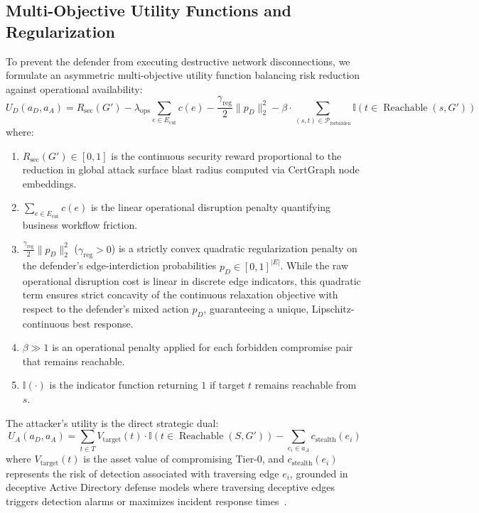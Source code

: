 \subsection{Multi-Objective Utility Functions and Regularization}
To prevent the defender from executing destructive network disconnections, we formulate an asymmetric multi-objective utility function balancing risk reduction against operational availability:
\begin{equation}
U_D(a_D, a_A) = R_{\text{sec}}(G') - \lambda_{\text{ops}} \sum_{e \in E_{\text{cut}}} c(e) - \frac{\gamma_{\text{reg}}}{2} \|p_D\|_2^2 - \beta \cdot \sum_{(s, t) \in \mathcal{P}_{\text{forbidden}}} \mathbb{I}(t \in \operatorname{Reachable}(s, G'))
\end{equation}
where:
\begin{enumerate}
    \item $R_{\text{sec}}(G') \in [0, 1]$ is the continuous security reward proportional to the reduction in global attack surface blast radius computed via CertGraph node embeddings.
    \item $\sum_{e \in E_{\text{cut}}} c(e)$ is the linear operational disruption penalty quantifying business workflow friction.
    \item $\frac{\gamma_{\text{reg}}}{2} \|p_D\|_2^2$ ($\gamma_{\text{reg}} > 0$) is a strictly convex quadratic regularization penalty on the defender's edge-interdiction probabilities $p_D \in [0, 1]^{|E|}$. While the raw operational disruption cost is linear in discrete edge indicators, this quadratic term ensures strict concavity of the continuous relaxation objective with respect to the defender's mixed action $p_D$, guaranteeing a unique, Lipschitz-continuous best response.
    \item $\beta \gg 1$ is an operational penalty applied for each forbidden compromise pair that remains reachable.
    \item $\mathbb{I}(\cdot)$ is the indicator function returning $1$ if target $t$ remains reachable from $s$.
\end{enumerate}

The attacker's utility is the direct strategic dual:
\begin{equation}
U_A(a_D, a_A) = \sum_{t \in T} V_{\text{target}}(t) \cdot \mathbb{I}(t \in \operatorname{Reachable}(S, G')) - \sum_{e_i \in a_A} c_{\text{stealth}}(e_i)
\end{equation}
where $V_{\text{target}}(t)$ is the asset value of compromising Tier-0, and $c_{\text{stealth}}(e_i)$ represents the risk of detection associated with traversing edge $e_i$, grounded in deceptive Active Directory defense models where traversing deceptive edges triggers detection alarms or maximizes incident response times~\cite{ngo2023honeypot,ngo2024decoy}.

